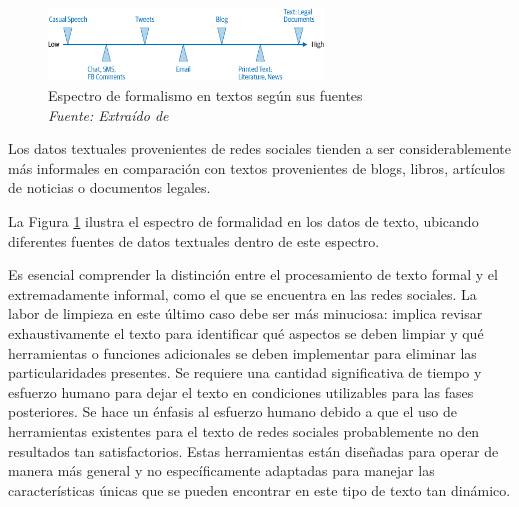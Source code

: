 \begin{figure}[h!]
	\includegraphics[width=0.65\textwidth]{capitulo3/figuras/nlp7.png}
	\caption[Espectro de formalismo en textos según sus fuentes]{Espectro de formalismo en textos según sus fuentes
		\\\textit{Fuente: Extraído de} \protect\cite[p. 283]{vajjala2020practical} }
	\label{fig:nlp7}
\end{figure}

Los datos textuales provenientes de redes sociales tienden a ser considerablemente más informales en comparación con textos provenientes de blogs, libros, artículos de noticias o documentos legales.

 La Figura \ref{fig:nlp7} ilustra el espectro de formalidad en los datos de texto, ubicando diferentes fuentes de datos textuales dentro de este espectro.



Es esencial comprender la distinción entre el procesamiento de texto formal y el extremadamente informal, como el que se encuentra en las redes sociales. La labor de limpieza en este último caso debe ser más minuciosa: implica revisar exhaustivamente el texto para identificar qué aspectos se deben limpiar y qué herramientas o funciones adicionales se deben implementar para eliminar las particularidades presentes. Se requiere una cantidad significativa de tiempo y esfuerzo humano para dejar el texto en condiciones utilizables para las fases posteriores. Se hace un énfasis al esfuerzo humano debido a que el uso de herramientas existentes para el texto de redes sociales probablemente no den resultados tan satisfactorios. Estas herramientas están diseñadas para operar de manera más general y no específicamente adaptadas para manejar las características únicas que se pueden encontrar en este tipo de texto tan dinámico.